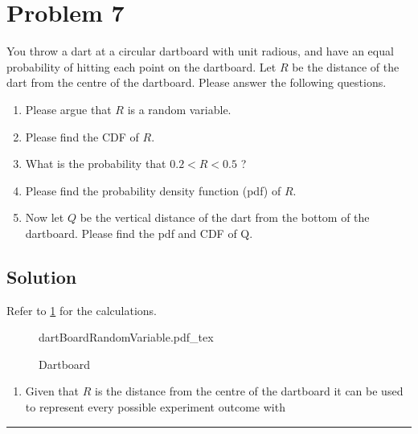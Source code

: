 \section{Problem 7}
You throw a dart at a circular dartboard with unit radious, and have an equal probability of hitting each point on the dartboard. Let $R$ be the distance of the dart from the centre of the dartboard. Please answer the following questions.

\begin{enumerate}[7a.]
	\item Please argue that $R$ is a random variable.
	\item Please find the CDF of $R$.
	\item What is the probability that $0.2<R<0.5$ ?
	\item Please find the probability density function (pdf) of $R$.
	\item Now let $Q$ be the vertical distance of the dart from the bottom of the dartboard. Please find the pdf and CDF of Q.
\end{enumerate}
\subsection{Solution}

Refer to \cref{fig:dartBoardRandomVariable} for the calculations.

\begin{figure}[H]
	\centering
	\begin{adjustbox}{max width=\textwidth}
		{dartBoardRandomVariable.pdf_tex}
	\end{adjustbox}
	\caption{Dartboard}
	\label{fig:dartBoardRandomVariable}
\end{figure}

\begin{enumerate}[7a.]
	\item Given that $R$ is the distance from the centre of the dartboard it can be used to represent every possible experiment outcome with
\end{enumerate}	
\noindent\rule{\textwidth}{1pt}
